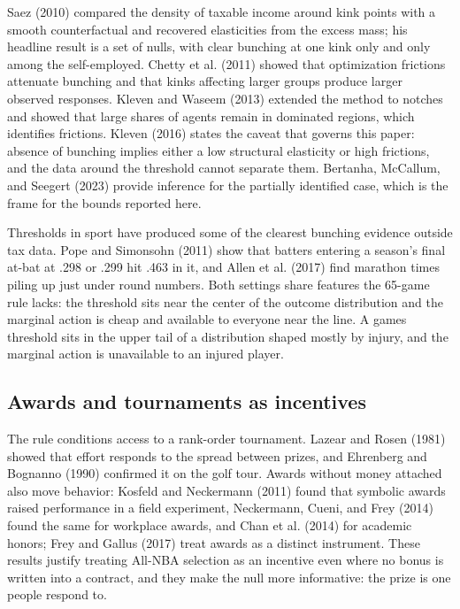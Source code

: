 \documentclass[11pt]{article}
\begin{document}
Saez (2010) compared the density of taxable income around kink points with a smooth counterfactual and recovered elasticities from the excess mass; his headline result is a set of nulls, with clear bunching at one kink only and only among the self-employed. Chetty et al. (2011) showed that optimization frictions attenuate bunching and that kinks affecting larger groups produce larger observed responses. Kleven and Waseem (2013) extended the method to notches and showed that large shares of agents remain in dominated regions, which identifies frictions. Kleven (2016) states the caveat that governs this paper: absence of bunching implies either a low structural elasticity or high frictions, and the data around the threshold cannot separate them. Bertanha, McCallum, and Seegert (2023) provide inference for the partially identified case, which is the frame for the bounds reported here.

Thresholds in sport have produced some of the clearest bunching evidence outside tax data. Pope and Simonsohn (2011) show that batters entering a season's final at-bat at .298 or .299 hit .463 in it, and Allen et al. (2017) find marathon times piling up just under round numbers. Both settings share features the 65-game rule lacks: the threshold sits near the center of the outcome distribution and the marginal action is cheap and available to everyone near the line. A games threshold sits in the upper tail of a distribution shaped mostly by injury, and the marginal action is unavailable to an injured player.


\subsection*{Awards and tournaments as incentives}


The rule conditions access to a rank-order tournament. Lazear and Rosen (1981) showed that effort responds to the spread between prizes, and Ehrenberg and Bognanno (1990) confirmed it on the golf tour. Awards without money attached also move behavior: Kosfeld and Neckermann (2011) found that symbolic awards raised performance in a field experiment, Neckermann, Cueni, and Frey (2014) found the same for workplace awards, and Chan et al. (2014) for academic honors; Frey and Gallus (2017) treat awards as a distinct instrument. These results justify treating All-NBA selection as an incentive even where no bonus is written into a contract, and they make the null more informative: the prize is one people respond to.
\end{document}
